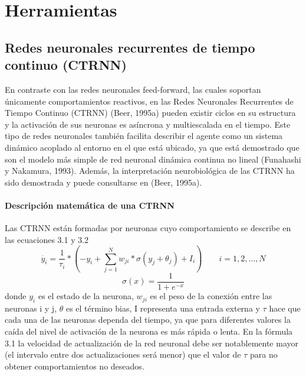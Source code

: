 \chapter{Herramientas}

\section{Redes neuronales recurrentes de tiempo continuo (CTRNN)}
En contraste con las redes neuronales feed-forward, las cuales soportan únicamente comportamientos
reactivos, en las Redes Neuronales Recurrentes de Tiempo Continuo (CTRNN) (Beer,
1995a) pueden existir ciclos en su estructura y la activación de sus neuronas es asíncrona y multiescalada
en el tiempo. Este tipo de redes neuronales también facilita describir el agente como un
sistema dinámico acoplado al entorno en el que está ubicado, ya que está demostrado que son el
modelo más simple de red neuronal dinámica continua no lineal (Funahashi y Nakamura, 1993).
Además, la interpretación neurobiológica de las CTRNN ha sido demostrada y puede consultarse
en (Beer, 1995a).

\subsubsection{Descripción matemática de una CTRNN}
Las CTRNN están formadas por neuronas cuyo comportamiento se describe en las ecuaciones 3.1 y 3.2
\begin{equation} \label{eq:funcionCTRNN}
	\dot{y_{i}}= \frac{1}{\tau_{i}} * \left ( -y_{i}+\sum_{j=1}^{N}w_{ji}*\sigma \left ( y_{j} + \theta _{j} \right ) + I_{i} \right ) \qquad i =1,2,...,N
\end{equation}
\begin{equation} \label{eq:funcionSIGMOIDE}
	\sigma (x)=\frac{1}{1+e^{-x}}
\end{equation}
donde $y_{i}$ es el estado de la neurona, $w_{ji}$ es el peso de la conexión entre las neuronas i y j,
$\theta$ es el término bias, I representa una entrada externa y $\tau$ hace que cada una de las neuronas
dependa del tiempo, ya que para diferentes valores la caída del nivel de activación de la neurona
es más rápida o lenta. En la fórmula 3.1 la velocidad de actualización de la red neuronal debe ser
notablemente mayor (el intervalo entre dos actualizaciones será menor) que el valor de $\tau$ para no
obtener comportamientos no deseados.

